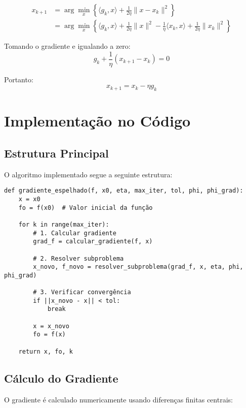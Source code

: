 \documentclass[12pt]{article}
\begin{document}
\begin{align}
x_{k+1} &= \arg\min_{x} \left\{ \langle g_k, x \rangle + \frac{1}{2\eta}\|x - x_k\|^2 \right\} \\
&= \arg\min_{x} \left\{ \langle g_k, x \rangle + \frac{1}{2\eta}\|x\|^2 - \frac{1}{\eta}\langle x_k, x \rangle + \frac{1}{2\eta}\|x_k\|^2 \right\}
\end{align}

Tomando o gradiente e igualando a zero:
\begin{equation}
g_k + \frac{1}{\eta}(x_{k+1} - x_k) = 0
\end{equation}

Portanto:
\begin{equation}
x_{k+1} = x_k - \eta g_k
\end{equation}

\section{Implementação no Código}

\subsection{Estrutura Principal}

O algoritmo implementado segue a seguinte estrutura:

\begin{verbatim}
def gradiente_espelhado(f, x0, eta, max_iter, tol, phi, phi_grad):
    x = x0
    fo = f(x0)  # Valor inicial da função
    
    for k in range(max_iter):
        # 1. Calcular gradiente
        grad_f = calcular_gradiente(f, x)
        
        # 2. Resolver subproblema
        x_novo, f_novo = resolver_subproblema(grad_f, x, eta, phi, phi_grad)
        
        # 3. Verificar convergência
        if ||x_novo - x|| < tol:
            break
            
        x = x_novo
        fo = f(x)
    
    return x, fo, k
\end{verbatim}

\subsection{Cálculo do Gradiente}

O gradiente é calculado numericamente usando diferenças finitas centrais:
\end{document}
